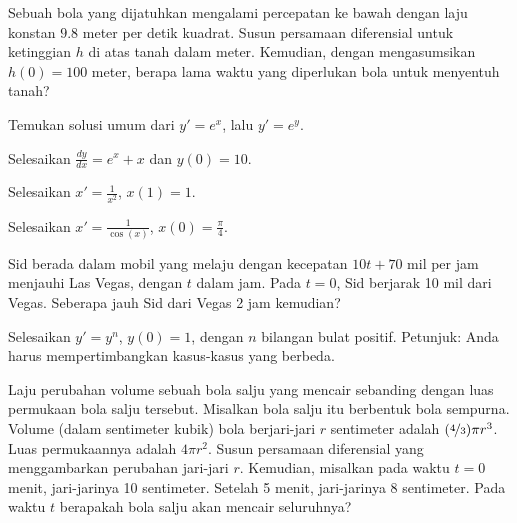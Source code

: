 \begin{exercise}
Sebuah bola yang dijatuhkan mengalami percepatan ke bawah dengan laju konstan $9.8$ meter per detik
kuadrat.  Susun persamaan diferensial untuk ketinggian $h$ di atas tanah dalam meter.
Kemudian, dengan mengasumsikan $h(0) = 100$ meter, berapa lama waktu yang diperlukan bola untuk menyentuh
tanah?
\end{exercise}

\begin{exercise}
Temukan solusi umum dari
$y' = e^x$, lalu $y' = e^y$.
\end{exercise}


\setcounter{exercise}{100}

\begin{exercise}
Selesaikan $\frac{dy}{dx} = e^x + x$ dan $y(0) = 10$.
\end{exercise}

\begin{exercise}
Selesaikan $x' = \frac{1}{x^2}$, $x(1)=1$.
\end{exercise}

\begin{exercise}
Selesaikan $x' = \frac{1}{\cos(x)}$, $x(0)=\frac{\pi}{4}$.
\end{exercise}

\begin{exercise}
Sid berada dalam mobil yang melaju dengan kecepatan $10t+70$ mil per jam menjauhi Las Vegas,
dengan $t$ dalam jam.  Pada $t=0$, Sid berjarak 10 mil dari Vegas.  Seberapa
jauh Sid dari Vegas 2 jam kemudian?
\end{exercise}

\begin{exercise}
Selesaikan $y' = y^n$, $y(0) = 1$, dengan $n$ bilangan bulat positif.
Petunjuk: Anda harus mempertimbangkan kasus-kasus yang berbeda.
\end{exercise}

\begin{exercise}
Laju perubahan volume sebuah bola salju yang mencair
sebanding dengan luas permukaan bola salju tersebut.  Misalkan
bola salju itu berbentuk bola sempurna.  Volume (dalam sentimeter kubik)
bola berjari-jari $r$ sentimeter adalah
$(\nicefrac{4}{3}) \pi r^3$.  Luas permukaannya adalah
$4 \pi r^2$.  Susun persamaan diferensial yang menggambarkan perubahan jari-jari $r$.
Kemudian, misalkan pada waktu $t=0$ menit, jari-jarinya 10 sentimeter.
Setelah 5 menit, jari-jarinya 8 sentimeter.  Pada waktu $t$ berapakah
bola salju akan mencair seluruhnya?
\end{exercise}

